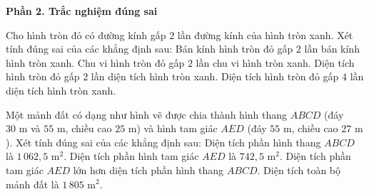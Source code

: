 \textbf{Phần 2. Trắc nghiệm đúng sai}

\begin{ex} %
Cho hình tròn đỏ có đường kính gấp $2$ lần đường kính của hình tròn xanh. Xét tính đúng sai của các khẳng định sau:
\choiceTF
{\True Bán kính hình tròn đỏ gấp $2$ lần bán kính hình tròn xanh.}
{\True Chu vi hình tròn đỏ gấp $2$ lần chu vi hình tròn xanh.}
{Diện tích hình tròn đỏ gấp $2$ lần diện tích hình tròn xanh.}
{\True Diện tích hình tròn đỏ gấp $4$ lần diện tích hình tròn xanh.}
\end{ex}

\begin{ex} %
Một mảnh đất có dạng như hình vẽ được chia thành hình thang $ABCD$ (đáy $30\text{ m}$ và $55\text{ m}$, chiều cao $25\text{ m}$) và hình tam giác $AED$ (đáy $55\text{ m}$, chiều cao $27\text{ m}$). Xét tính đúng sai của các khẳng định sau:
\choiceTF
{\True Diện tích phần hình thang $ABCD$ là $1\,062{,}5\text{ m}^2$.}
{\True Diện tích phần hình tam giác $AED$ là $742{,}5\text{ m}^2$.}
{Diện tích phần tam giác $AED$ lớn hơn diện tích phần hình thang $ABCD$.}
{\True Diện tích toàn bộ mảnh đất là $1\,805\text{ m}^2$.}
\end{ex}

